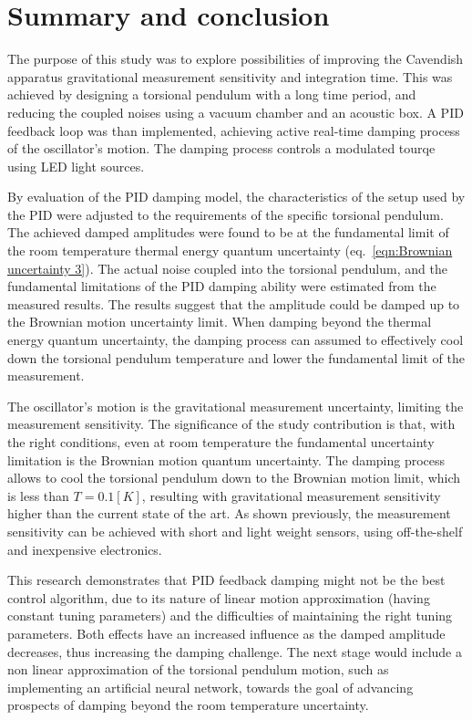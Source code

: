 \documentclass[\main/master.tex]{subfiles}
\begin{document}
\newspacing
\chapter{Summary and conclusion}\label{chapter:Summary and conclusion}
The purpose of this study was to explore possibilities of improving the Cavendish apparatus gravitational measurement sensitivity and integration time. This was achieved by designing a torsional pendulum with a long time period, and reducing the coupled noises using a vacuum chamber and an acoustic box. A PID feedback loop was than implemented, achieving active real-time damping process of the oscillator's motion. The damping process controls a modulated tourqe using LED light sources. 
\par\noindent
By evaluation of the PID damping model, the characteristics of the setup used by the PID were adjusted to the requirements of the specific torsional pendulum. The achieved damped amplitudes were found to be at the fundamental limit of the room temperature thermal energy quantum uncertainty (eq.~\ref{eqn:Brownian uncertainty 3}). The actual noise coupled into the torsional pendulum, and the fundamental limitations of the PID damping ability were estimated from the measured results. The results suggest that the amplitude could be damped up to the Brownian motion uncertainty limit. When damping beyond the thermal energy quantum uncertainty, the damping process can assumed to effectively cool down the torsional pendulum temperature and lower the fundamental limit of the measurement. 
\par\noindent
The oscillator's motion is the gravitational measurement uncertainty, limiting the measurement sensitivity. The significance of the study contribution is that, with the right conditions, even at room temperature the fundamental uncertainty limitation is the Brownian motion quantum uncertainty. The damping process allows to cool the torsional pendulum down to the Brownian motion limit, which is less than $T=0.1[K]$, resulting with gravitational measurement sensitivity higher than the current state of the art. As shown previously, the  measurement sensitivity can be achieved with short and light weight sensors, using off-the-shelf and inexpensive electronics.
\par\noindent
This research demonstrates that PID feedback damping might not be the best control algorithm, due to its nature of linear motion approximation (having constant tuning parameters) and the difficulties of maintaining the right tuning parameters. Both effects have an increased influence as the damped amplitude decreases, thus increasing the damping challenge. The next stage would include a non linear approximation of the torsional pendulum motion, such as implementing an artificial neural network, towards the goal of advancing prospects of damping beyond the room temperature uncertainty. 
\end{document}
